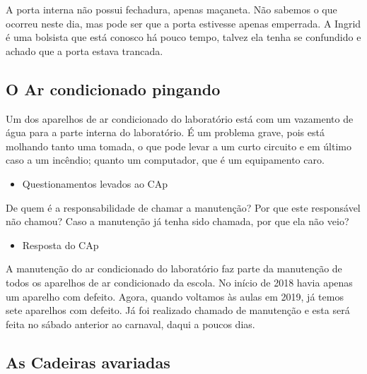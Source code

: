 A porta interna não possui fechadura, apenas maçaneta. Não sabemos o que ocorreu neste dia, mas pode ser que a porta estivesse apenas emperrada. A Ingrid é uma bolsista que está conosco há pouco tempo, talvez ela tenha se confundido e achado que a porta estava trancada.

\subsection{O Ar condicionado pingando}\label{sec:LABEL_CHP_REL_SEC_PROBS_SUBSEC_AC}

Um dos aparelhos de ar condicionado do laboratório está com um vazamento de água para a parte interna do laboratório. É um problema grave, pois está molhando tanto uma tomada, o que pode levar a um curto circuito e em último caso a um incêndio; quanto um computador, que é um equipamento caro.

\begin{itemize}
    \item Questionamentos levados ao CAp
\end{itemize}

De quem é a responsabilidade de chamar a manutenção? Por que este responsável não chamou? Caso a manutenção já tenha sido chamada, por que ela não veio?

\begin{itemize}
    \item Resposta do CAp
\end{itemize}

A manutenção do ar condicionado do laboratório faz parte da manutenção de todos os aparelhos de ar condicionado da escola. No início de 2018 havia apenas um aparelho com defeito. Agora, quando voltamos às aulas em 2019, já temos sete aparelhos com defeito. Já foi realizado chamado de manutenção e esta será feita no sábado anterior ao carnaval, daqui a poucos dias.

\subsection{As Cadeiras avariadas}\label{sec:LABEL_CHP_REL_SEC_PROBS_SUBSEC_CAD}

